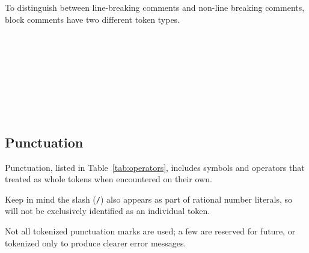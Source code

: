 To distinguish between line-breaking comments and non-line breaking comments,
block comments have two different token types.

\begin{bnf*}
     \\
     \\
     \\
     \\
     \\
     \\
     \\
\end{bnf*}

\subsection{Punctuation}
\FloatBarrier

Punctuation, listed in Table~\ref{tab:operators}, includes symbols and operators that
treated as whole tokens when encountered on their own.

Keep in mind the slash (\texttt{/}) also appears as part of rational number literals, so
will not be exclusively identified as an individual token.

Not all tokenized punctuation marks are used; a few are reserved for future, or tokenized
only to produce clearer error messages.


